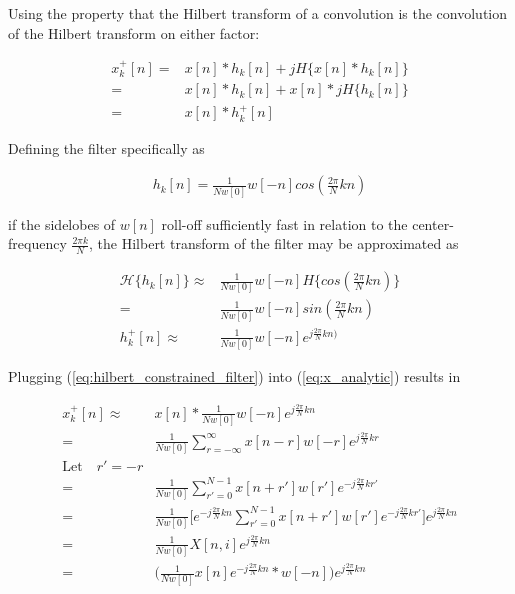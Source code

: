 \documentclass [11pt, proquest,oneside] {ganter_thesis}[2015/03/03]
\begin{document}
Using the property that the Hilbert transform of a convolution is the convolution of the Hilbert transform on either factor:

\begin{align}
\label{eq:x_analytic}
x^+_k[n] =& x[n] * h_k[n] + jH\{x[n] * h_k[n]\} \nonumber \\
=& x[n] * h_k[n] + x[n] * jH\{h_k[n]\} \nonumber \\
=& x[n] * h^+_k[n]
\end{align}

Defining the filter specifically as

\begin{align}
h_k[n] = \frac{1}{Nw[0]}w[-n]cos(\frac{2\pi}{N}kn)
\end{align}

if the sidelobes of $w[n]$ roll-off sufficiently fast in relation to the center-frequency $\frac{2\pi k}{N}$, the Hilbert transform of the filter may be approximated as

\begin{align}
\mathcal{H}\{h_k[n]\} \approx& \frac{1}{Nw[0]}w[-n] H\{cos(\frac{2\pi}{N}kn)\} \nonumber \\
=& \frac{1}{Nw[0]}w[-n]sin(\frac{2\pi}{N}kn) \\
\label{eq:hilbert_constrained_filter}
h^+_k[n] \approx& \frac{1}{Nw[0]}w[-n]e^{j\frac{2\pi}{N}kn)}
\end{align}


Plugging (\ref{eq:hilbert_constrained_filter}) into (\ref{eq:x_analytic}) results in

\begin{align}
x^+_k[n] \approx& x[n] * \frac{1}{Nw[0]}w[-n]e^{j\frac{2\pi}{N}kn} \nonumber \\
=& \frac{1}{Nw[0]}\sum\limits_{r=-\infty}^{\infty}x[n - r] w[-r] e^{j\frac{2\pi}{N}kr} \nonumber \\
\textrm{Let} \quad r' = -r \nonumber \\
=& \frac{1}{Nw[0]}\sum\limits_{r'=0}^{N-1} x[n + r'] w[r'] e^{-j\frac{2\pi}{N}kr'} \nonumber \\
=& \frac{1}{Nw[0]}\bigg[e^{-j\frac{2\pi}{N}kn} \sum\limits_{r'=0}^{N-1} x[n + r'] w[r'] e^{-j\frac{2\pi}{N}kr'}\bigg]e^{j\frac{2\pi}{N}kn} \nonumber \\
=& \frac{1}{Nw[0]}X[n,i]e^{j\frac{2\pi}{N}kn} \nonumber \\
=& \Bigg( \frac{1}{Nw[0]}  x[n] e^{-j\frac{2\pi}{N}kn} * w[-n] \Bigg) e^{j\frac{2\pi}{N}kn}
\end{align}
\end{document}
